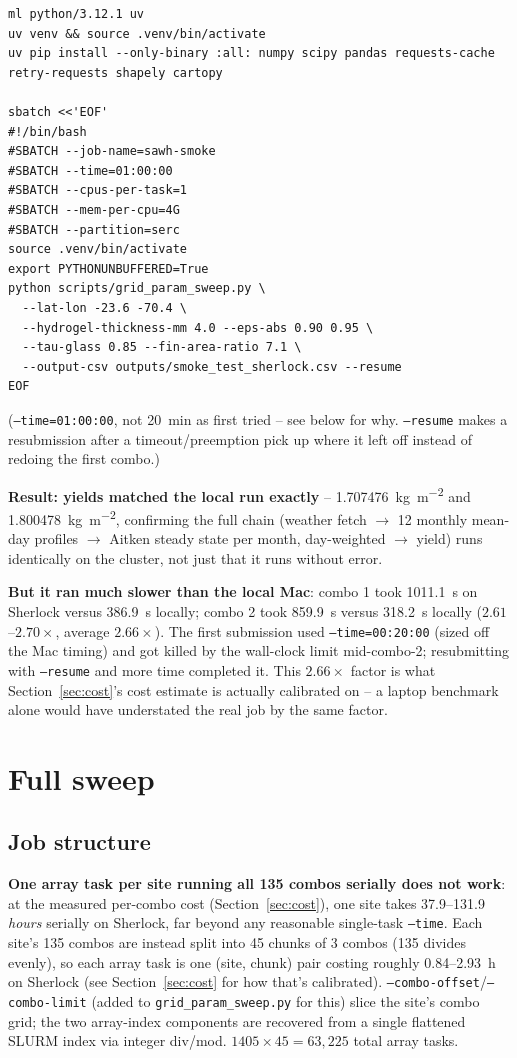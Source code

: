 \documentclass[11pt]{article}
\begin{document}
\begin{verbatim}
ml python/3.12.1 uv
uv venv && source .venv/bin/activate
uv pip install --only-binary :all: numpy scipy pandas requests-cache retry-requests shapely cartopy

sbatch <<'EOF'
#!/bin/bash
#SBATCH --job-name=sawh-smoke
#SBATCH --time=01:00:00
#SBATCH --cpus-per-task=1
#SBATCH --mem-per-cpu=4G
#SBATCH --partition=serc
source .venv/bin/activate
export PYTHONUNBUFFERED=True
python scripts/grid_param_sweep.py \
  --lat-lon -23.6 -70.4 \
  --hydrogel-thickness-mm 4.0 --eps-abs 0.90 0.95 \
  --tau-glass 0.85 --fin-area-ratio 7.1 \
  --output-csv outputs/smoke_test_sherlock.csv --resume
EOF
\end{verbatim}

(\texttt{--time=01:00:00}, not \SI{20}{\minute} as first tried -- see below for why.
\texttt{--resume} makes a resubmission after a timeout/preemption pick up where it left off
instead of redoing the first combo.)

\textbf{Result: yields matched the local run exactly} --
\SI{1.707476}{\kilo\gram\per\meter\squared} and \SI{1.800478}{\kilo\gram\per\meter\squared},
confirming the full chain (weather fetch $\to$ 12 monthly mean-day profiles $\to$ Aitken steady
state per month, day-weighted $\to$ yield) runs identically on the cluster, not just that it
runs without error.

\textbf{But it ran much slower than the local Mac}: combo 1 took \SI{1011.1}{\second} on
Sherlock versus \SI{386.9}{\second} locally; combo 2 took \SI{859.9}{\second} versus
\SI{318.2}{\second} locally ($2.61$--$2.70\times$, average $2.66\times$). The first submission
used \texttt{--time=00:20:00} (sized off the Mac timing) and got killed by the wall-clock limit
mid-combo-2; resubmitting with \texttt{--resume} and more time completed it. This
$2.66\times$ factor is what Section~\ref{sec:cost}'s cost estimate is actually calibrated on --
a laptop benchmark alone would have understated the real job by the same factor.

\section{Full sweep}\label{sec:full-sweep}

\subsection{Job structure}
\textbf{One array task per site running all 135 combos serially does not work}: at the measured
per-combo cost (Section~\ref{sec:cost}), one site takes 37.9--131.9 \emph{hours} serially on
Sherlock, far beyond any reasonable single-task \texttt{--time}. Each site's 135 combos are
instead split into 45 chunks of 3 combos (135 divides evenly), so each array task is one (site,
chunk) pair costing roughly \SI{0.84}{}--\SI{2.93}{\hour} on Sherlock (see
Section~\ref{sec:cost} for how that's calibrated). \texttt{--combo-offset}/\texttt{--combo-limit}
(added to \texttt{grid\_param\_sweep.py} for this) slice the site's combo grid; the two
array-index components are recovered from a single flattened SLURM index via integer div/mod.
$1405 \times 45 = 63{,}225$ total array tasks.
\end{document}

